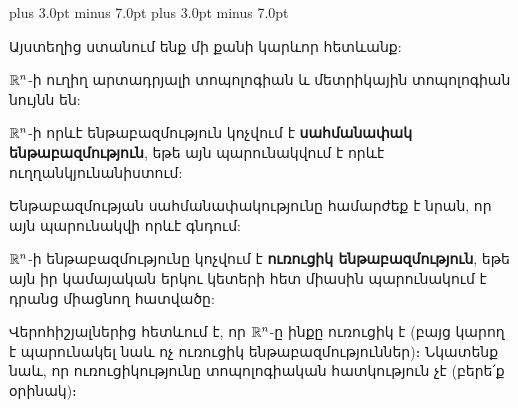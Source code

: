 \documentclass[./main.tex]{subfiles}
\begin{document}
\belowdisplayskip=12.0pt plus 3.0pt minus 7.0pt
\abovedisplayskip=12.0pt plus 3.0pt minus 7.0pt
\par Այստեղից ստանում ենք մի քանի կարևոր հետևանք:
\begin{theorem}\label{ch13thm9}
$\mathbb{R}^n$-ի ուղիղ արտադրյալի տոպոլոգիան և մետրիկային տոպոլոգիան նույնն են:
\end{theorem}
\begin{definition}
$\mathbb{R}^n$-ի որևէ ենթաբազմություն կոչվում է \textbf{սահմանափակ ենթա\-բազ\-մու\-թյուն}, եթե այն պարունակվում է որևէ ուղղանկյունանիստում:
\end{definition}
\begin{hetevanq}\label{ch13cor3}
Ենթաբազմության սահմանափակությունը համարժեք է նրան, որ այն պարունակվի որևէ գնդում:
\end{hetevanq}
\begin{definition}
$\mathbb{R}^n$-ի ենթաբազմությունը կոչվում է \textbf{ուռուցիկ ենթաբազմություն}, եթե այն իր կամայական երկու կետերի հետ միասին պարունակում է դրանց միաց\-նող հատվածը:
\end{definition}

\par Վերոհիշյալներից հետևում է, որ $\mathbb{R}^n$-ը ինքը ուռուցիկ է (բայց կարող է պարու\-նա\-կել նաև ոչ ուռուցիկ ենթաբազմություններ)։ Նկատենք նաև, որ ուռուցիկությունը տո\-պո\-լո\-գիական հատկություն չէ (բերե՛ք օրինակ)։


\end{document}
